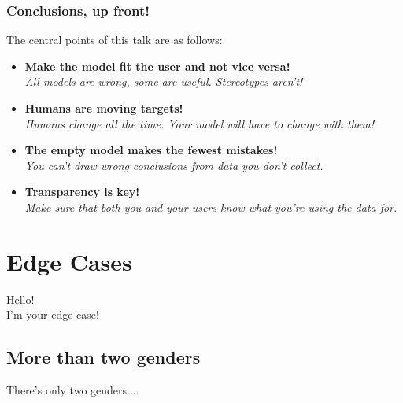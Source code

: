 \documentclass[aspectratio=169,x11names]{beamer}
\begin{document}
\begin{frame}
\frametitle{Conclusions, up front!}
\large
The central points of this talk are as follows:\bigskip

\begin{itemize}
\pause\item \textbf{Make the model fit the user and not vice versa!}\\
\emph{All models are wrong, some are useful. Stereotypes aren't!}\medskip
\pause\item \textbf{Humans are moving targets!}\\
\emph{Humans change all the time. Your model will have to change with them!}\medskip
\pause\item \textbf{The empty model makes the fewest mistakes!}\\
\emph{You can't draw wrong conclusions from data you don't collect.}\medskip
\pause\item \textbf{Transparency is key!}\\
\emph{Make sure that both you and your users know what you're using the data for.}
\end{itemize}
\end{frame}


\section{Edge Cases}

\begin{frame}
\begin{center}
\huge
Hello!\\
I'm your edge case!
\end{center}
\end{frame}

\subsection{More than two genders}

\begin{frame}
\begin{center}
\huge
There's only two genders...
\end{center}
\end{frame}
\end{document}
